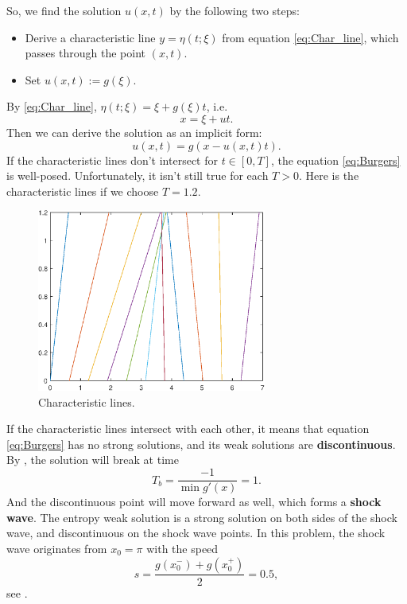 \documentclass[a4paper]{article}
\begin{document}
So, we find the solution $u(x,t)$ by the following two steps:
\begin{itemize}
    \item Derive a characteristic line $y=\eta(t;\xi)$ from equation \eqref{eq:Char_line}, 
    which passes through the point $(x,t)$.
    \item Set $u(x,t):=g(\xi)$.
\end{itemize}
By \eqref{eq:Char_line}, $\eta(t;\xi)=\xi+g(\xi)t$, i.e. 
\begin{displaymath}
    x=\xi+ut.
\end{displaymath}
Then we can derive the solution as an implicit form:
\begin{equation}
    \label{eq:sol_of_Burgers}
    u(x,t)=g(x-u(x,t)t).
\end{equation}
If the characteristic lines don't intersect for $t\in[0,T]$, 
the equation \eqref{eq:Burgers} is well-posed. 
Unfortunately, it isn't still true for each $T>0$. Here is the characteristic lines 
if we choose $T=1.2$.
\begin{figure}[H]
    \centering
    \includegraphics[width=\linewidth,height=6cm]{figure/Charline.eps}
    \caption{Characteristic lines.}
\end{figure}
If the characteristic lines intersect with each other, it means that 
equation \eqref{eq:Burgers} has no strong solutions, and its weak solutions are 
\textbf{discontinuous}. By \cite[Exercise 3.3]{1}, the solution will break at time 
\begin{equation}
    T_{b}=\frac{-1}{\min g'(x)}=1.
\end{equation}
And the discontinuous point will move forward as well, which forms a \textbf{shock wave}. 
The entropy weak solution is a strong solution on both sides of the shock wave, 
and discontinuous on the shock wave points. 
In this problem, the shock wave originates from $x_{0}=\pi$ with the speed 
\begin{equation}
    s=\frac{g(x_{0}^-)+g(x_{0}^{+})}{2}=0.5,
\end{equation}
see \cite[(3.26)]{1}.
\end{document}
